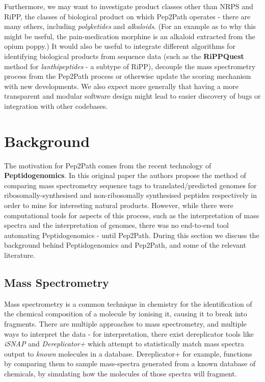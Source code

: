 \documentclass{l4proj}
\newcommand{\cit}[1]{\citep{#1}}
\begin{document}
Furthermore, we may want to investigate product classes other than NRPS and RiPP, the classes of biological product on which Pep2Path operates - there are many others, including \textit{polyketides} and \textit{alkaloids}. (For an example as to why this might be useful, the pain-medication morphine is an alkaloid extracted from the opium poppy.) It would also be useful to integrate different algorithms for identifying biological products from sequence data (such as the \textbf{RiPPQuest} \cit{rippq} method for \textit{lanthipeptides} - a subtype of RiPP), decouple the mass spectrometry process from the Pep2Path process or otherwise update the scoring mechanism with new developments. We also expect more generally that having a more transparent and modular software design might lead to easier discovery of bugs or integration with other codebases.

\chapter{Background}

The motivation for Pep2Path comes from the recent technology of \textbf{Peptidogenomics}. \cit{peptidogenomics} In this original paper the authors propose the method of comparing mass spectrometry sequence tags to translated/predicted genomes for ribosomally-synthesised and non-ribosomally synthesised peptides respectively in order to mine for interesting natural products. However, while there were computational tools for aspects of this process, such as the interpretation of mass spectra and the interpretation of genomes, there was no end-to-end tool automating Peptidogenomics - until Pep2Path. During this section we discuss the background behind Peptidogenomics and Pep2Path, and some of the relevant literature.

\section{Mass Spectrometry}

Mass spectrometry is a common technique in chemistry for the identification of the chemical composition of a molecule by ionising it, causing it to break into fragments. There are multiple approaches to mass spectrometry, and multiple ways to interpret the data - for interpretation, there exist dereplicator tools like \textit{iSNAP} \cit{isnap} and \textit{Dereplicator+} \cit{derep+} which attempt to statistically match mass spectra output to \textit{known} molecules in a database. Dereplicator+ for example, functions by comparing them to sample mass-spectra generated from a known database of chemicals, by simulating how the molecules of those spectra will fragment. 
\end{document}
